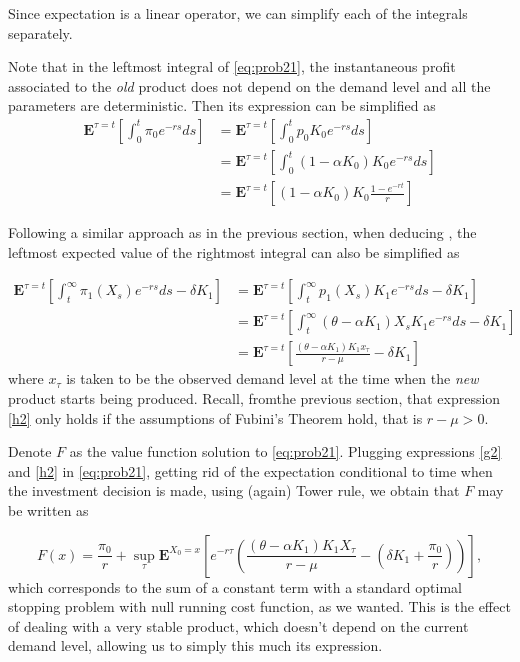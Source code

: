 Since expectation is a linear operator, we can simplify each of the integrals separately.

Note that in the leftmost integral of \eqref{eq:prob21}, the instantaneous profit associated to the \textit{old} product does not depend on the demand level and all the parameters are deterministic. Then its expression can be simplified as
\begin{align}
\textbf{E}^{\tau=t} \left[\int_0^t \pi_0e^{-rs} ds \right] 
&= \textbf{E}^{\tau=t} \left[ \int_0^t p_0K_0e^{-rs} ds \right] \nonumber \\
&= \textbf{E}^{\tau=t} \left[ \int_0^t (1-\alpha K_0) K_0e^{-rs} ds \right] \nonumber \\
&= \textbf{E}^{\tau=t} \left[ (1-\alpha K_0) K_0 \frac{1-e^{-r t}}{r} \right] 
\label{g2}
\end{align}

Following a similar approach as in the previous section, when deducing , the leftmost expected value of the rightmost integral can also be simplified as

\begin{align}
\textbf{E}^{\tau=t} \left[  \int_t^\infty \pi_1(X_s)e^{-rs} ds -\delta K_1 \right]
&=  \textbf{E}^{\tau=t} \left[  \int_t^\infty p_1(X_s) K_1e^{-rs} ds -\delta K_1 \right] \nonumber \\
&= \textbf{E}^{\tau=t} \left[ \int_t^\infty (\theta-\alpha K_1)X_s K_1e^{-rs} ds -\delta K_1 \right] \nonumber \\
&= \textbf{E}^{\tau=t} \left[\frac{(\theta-\alpha K_1)K_1 x_\tau}{r-\mu} -\delta K_1 \right] 
\label{h2}
\end{align}
where $x_\tau$ is taken to be the observed demand level at the time when the \textit{new} product starts being produced. Recall, fromthe previous section, that expression \eqref{h2} only holds if the assumptions of Fubini's Theorem hold, that is $r-\mu>0$.

Denote $F$ as the value function solution to \eqref{eq:prob21}. Plugging expressions \eqref{g2} and \eqref{h2} in \eqref{eq:prob21}, getting rid of the expectation conditional to time when the investment decision is made, using (again) Tower rule, we obtain that $F$ may be written as

\begin{equation}
F(x)=\frac{\pi_0}{r}+ \sup _\tau \textbf{E}^{X_0=x} \left[ e^{-r\tau}\left(\frac{(\theta-\alpha K_1)K_1 X_\tau}{r-\mu} - \left( \delta K_1  +\frac{\pi_0}{r}\right)  \right) \right],
\label{prob235}
\end{equation}
which corresponds to the sum of a constant term with a standard optimal stopping problem with null running cost function, as we wanted. This is the effect of dealing with a very stable product, which doesn't depend on the current demand level, allowing us to simply this much its expression.

